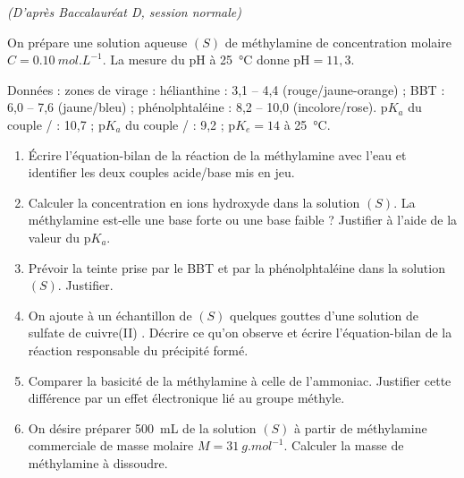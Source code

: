 \documentclass[11pt]{article}
\begin{document}
\begin{exercice}
\emph{(D'après Baccalauréat D, session normale)}

On prépare une solution aqueuse $(S)$ de méthylamine  de concentration molaire $C = \SI{0,10}{mol.L^{-1}}$. La mesure du pH à \SI{25}{\celsius} donne $\text{pH} = 11{,}3$.

Données : zones de virage : hélianthine : 3,1 -- 4,4 (rouge/jaune-orange) ; BBT : 6,0 -- 7,6 (jaune/bleu) ; phénolphtaléine : 8,2 -- 10,0 (incolore/rose). $\text{p}K_a$ du couple / : 10,7 ; $\text{p}K_a$ du couple / : 9,2 ; $\text{p}K_e = 14$ à \SI{25}{\celsius}.
\begin{enumerate}
\item Écrire l'équation-bilan de la réaction de la méthylamine avec l'eau et identifier les deux couples acide/base mis en jeu.
\item Calculer la concentration en ions hydroxyde  dans la solution $(S)$. La méthylamine est-elle une base forte ou une base faible ? Justifier à l'aide de la valeur du $\text{p}K_a$.
\item Prévoir la teinte prise par le BBT et par la phénolphtaléine dans la solution $(S)$. Justifier.
\item On ajoute à un échantillon de $(S)$ quelques gouttes d'une solution de sulfate de cuivre(II) . Décrire ce qu'on observe et écrire l'équation-bilan de la réaction responsable du précipité formé.
\item Comparer la basicité de la méthylamine à celle de l'ammoniac. Justifier cette différence par un effet électronique lié au groupe méthyle.
\item On désire préparer \SI{500}{mL} de la solution $(S)$ à partir de méthylamine commerciale de masse molaire $M = \SI{31}{g.mol^{-1}}$. Calculer la masse de méthylamine à dissoudre.
\end{enumerate}
\end{exercice}
\end{document}
